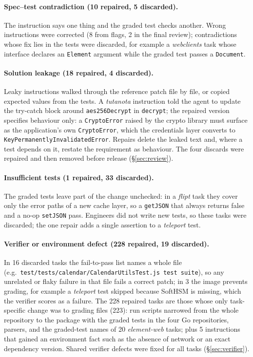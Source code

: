 \paragraph{Spec--test contradiction (10 repaired, 5 discarded).}
The instruction says one thing and the graded test checks another. Wrong instructions were corrected (8 from flags, 2 in the final review); contradictions whose fix lies in the tests were discarded, for example a \textit{webclients} task whose interface declares an \texttt{Element} argument while the graded test passes a \texttt{Document}.

\paragraph{Solution leakage (18 repaired, 4 discarded).}
Leaky instructions walked through the reference patch file by file, or copied expected values from the tests. A \textit{tutanota} instruction told the agent to update the try-catch block around \texttt{aes256Decrypt} in \texttt{decrypt}; the repaired version specifies behaviour only: a \texttt{CryptoError} raised by the crypto library must surface as the application's own \texttt{CryptoError}, which the credentials layer converts to \texttt{KeyPermanentlyInvalidatedError}. Repairs delete the leaked text and, where a test depends on it, restate the requirement as behaviour. The four discards were repaired and then removed before release (\S\ref{sec:review}).

\paragraph{Insufficient tests (1 repaired, 33 discarded).}
The graded tests leave part of the change unchecked: in a \textit{flipt} task they cover only the error paths of a new cache layer, so a \texttt{getJSON} that always returns false and a no-op \texttt{setJSON} pass. Engineers did not write new tests, so these tasks were discarded; the one repair adds a single assertion to a \textit{teleport} test.

\paragraph{Verifier or environment defect (228 repaired, 19 discarded).}
In 16 discarded tasks the fail-to-pass list names a whole file (e.g.\ \texttt{test/tests/calendar/\allowbreak CalendarUtilsTest.js \textbar{} test suite}), so any unrelated or flaky failure in that file fails a correct patch; in 3 the image prevents grading, for example a \textit{teleport} test skipped because SoftHSM is missing, which the verifier scores as a failure. The 228 repaired tasks are those whose only task-specific change was to grading files (223): run scripts narrowed from the whole repository to the package with the graded tests in the four Go repositories, parsers, and the graded-test names of 20 \textit{element-web} tasks; plus 5 instructions that gained an environment fact such as the absence of network or an exact dependency version. Shared verifier defects were fixed for all tasks (\S\ref{sec:verifier}).

